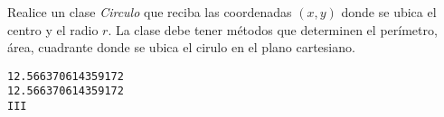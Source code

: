 \begin{exercise}{\rm 

Realice un clase \emph{Circulo} que reciba las coordenadas \((x,y)\)
donde se ubica el centro y el radio \(r\). La clase debe tener métodos
que determinen el perímetro, área, cuadrante donde se ubica el cirulo en
el plano cartesiano.

\begin{Shaded}
\begin{Highlighting}[]

     \NormalTok{(}
        \OperatorTok{=}
        \OperatorTok{=}
        \OperatorTok{=}

    \NormalTok{):}
          \OperatorTok{*}\OperatorTok{*} 

    \NormalTok{):}
        \OperatorTok{*} \OperatorTok{**}

    \NormalTok{):}
         \OperatorTok{\textgreater{}}   \OperatorTok{\textgreater{}} \NormalTok{:}
             
         \OperatorTok{\textless{}}   \OperatorTok{\textgreater{}} \NormalTok{:}
             
         \OperatorTok{\textgreater{}}   \OperatorTok{\textless{}} \NormalTok{:}
             
        \NormalTok{:}
             

\OperatorTok{=}\OperatorTok{{-}}\NormalTok{,}\OperatorTok{{-}}\NormalTok{,}\NormalTok{)}
\end{Highlighting}
\end{Shaded}

\begin{verbatim}
12.566370614359172
12.566370614359172
III

\end{verbatim}
}\end{exercise}


